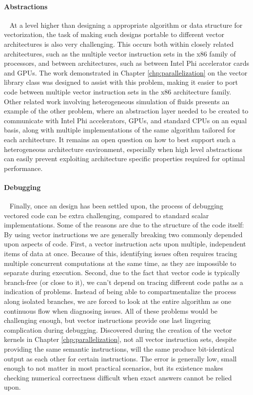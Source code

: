 \paragraph{Abstractions}~ At a level higher than designing a
appropriate algorithm or data structure for vectorization, the task of
making such designs portable to different vector architectures is also
very challenging. This occurs both within closely related
architectures, such as the multiple vector instruction sets in the x86
family of processors, and between architectures, such as between Intel
Phi accelerator cards and GPUs. The work demonstrated in Chapter
\ref{chp:parallelization} on the vector library class was designed to
assist with this problem, making it easier to port code between
multiple vector instruction sets in the x86 architecture family. Other
related work involving heterogeneous simulation of fluids
\citep{LiuMAS:2016} presents an example of the other problem, where an
abstraction layer needed to be created to communicate with Intel Phi
accelerators, GPUs, and standard CPUs on an equal basis, along with
multiple implementations of the same algorithm tailored for each
architecture. It remains an open question on how to best support such
a heterogeneous architecture environment, especially when high level
abstractions can easily prevent exploiting architecture specific
properties required for optimal performance.

\paragraph{Debugging}~ Finally, once an design has been settled upon,
the process of debugging vectored code can be extra challenging,
compared to standard scalar implementations. Some of the reasons are
due to the structure of the code itself: By using vector instructions
we are generally breaking two commonly depended upon aspects of
code. First, a vector instruction acts upon multiple, independent
items of data at once. Because of this, identifying issues often
requires tracing multiple concurrent computations at the same time, as
they are impossible to separate during execution. Second, due to the
fact that vector code is typically branch-free (or close to it), we
can't depend on tracing different code paths as a indication of
problems. Instead of being able to compartmentalize the process along
isolated branches, we are forced to look at the entire algorithm as
one continuous flow when diagnosing issues. All of these problems
would be challenging enough, but vector instructions provide one last
lingering complication during debugging. Discovered during the
creation of the vector kernels in Chapter \ref{chp:parallelization},
not all vector instruction sets, despite providing the same semantic
instructions, will the same produce bit-identical output as each other
for certain instructions. The error is generally low, small enough to
not matter in most practical scenarios, but its existence makes
checking numerical correctness difficult when exact answers cannot be
relied upon.
 
